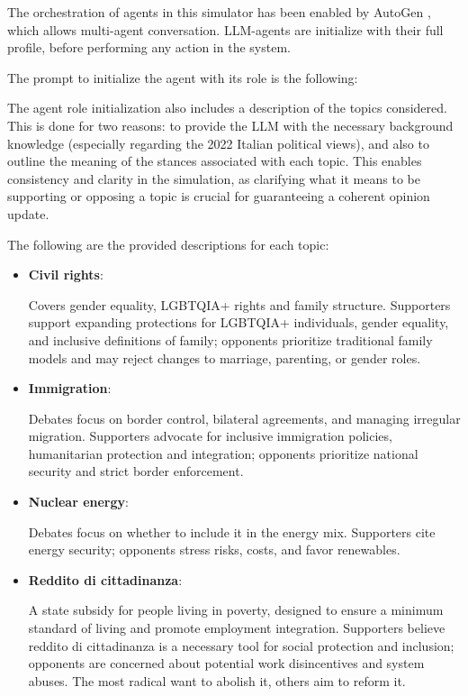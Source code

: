 \medskip
The orchestration of agents  in this simulator has been enabled by AutoGen \cite{pyautogen0.2.31, wu2023autogenenablingnextgenllm}, which allows multi-agent conversation.
LLM-agents are initialize with their full profile, before performing any action in the system. 

The prompt to initialize the agent with its role is the following: 


\medskip
The agent role initialization also includes a description of the topics considered.
This is done for two reasons: to provide the LLM with the necessary background knowledge (especially regarding the 2022 Italian political views), and also to outline the meaning of the stances associated with each topic.
This enables consistency and clarity in the simulation, as clarifying what it means to be supporting or opposing a topic is crucial for guaranteeing a coherent opinion update.

The following are the provided descriptions for each topic:

\begin{itemize}
    \item \textbf{Civil rights}:
        \begin{tcolorbox}[prompt]
            Covers gender equality, LGBTQIA+ rights and family structure. Supporters support expanding protections for LGBTQIA+ individuals, gender equality, and inclusive definitions of family; opponents prioritize traditional family models and may reject changes to marriage, parenting, or gender roles.
        \end{tcolorbox}

    \item \textbf{Immigration}:
        \begin{tcolorbox}[prompt]
            Debates focus on border control, bilateral agreements, and managing irregular migration. Supporters advocate for inclusive immigration policies, humanitarian protection and integration; opponents prioritize national security and strict border enforcement.
        \end{tcolorbox}

    \item \textbf{Nuclear energy}:
        \begin{tcolorbox}[prompt]
            Debates focus on whether to include it in the energy mix. Supporters cite energy security; opponents stress risks, costs, and favor renewables.
        \end{tcolorbox}

    \item \textbf{Reddito di cittadinanza}:
        \begin{tcolorbox}[prompt]
            A state subsidy for people living in poverty, designed to ensure a minimum standard of living and promote employment integration. Supporters believe reddito di cittadinanza is a necessary tool for social protection and inclusion; opponents are concerned about potential work disincentives and system abuses. The most radical want to abolish it, others aim to reform it.
        \end{tcolorbox}    
\end{itemize}


